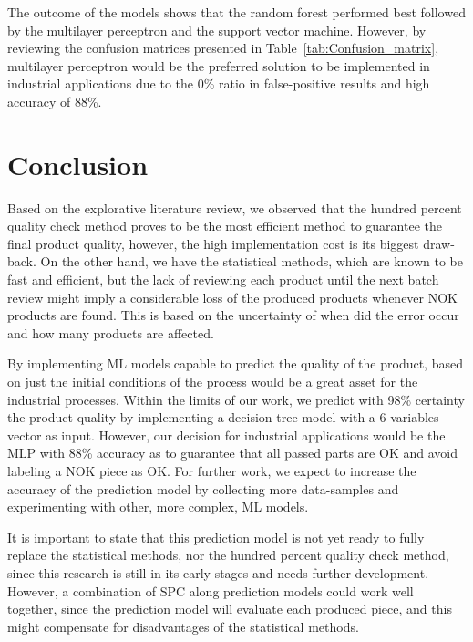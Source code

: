\documentclass[5p,times,procedia]{elsarticle}
\begin{document}
The outcome of the models shows that the random forest performed best followed by the multilayer perceptron and the support vector machine. However, by reviewing the confusion matrices presented in Table~\ref{tab:Confusion_matrix}, multilayer perceptron would be the preferred solution to be implemented in industrial applications due to the 0\% ratio in false-positive results and high accuracy of 88\%.

\section{Conclusion} \label{sec:conclusion}


Based on the explorative literature review, we observed that the hundred percent quality check method proves to be the most efficient method to guarantee the final product quality, however, the high implementation cost is its biggest draw-back. On the other hand, we have the statistical methods, which are known to be fast and efficient, but the lack of reviewing each product until the next batch review might imply a considerable loss of the produced products whenever NOK products are found. This is based on the uncertainty of when did the error occur and how many products are affected.

By implementing ML models capable to predict the quality of the product, based on just the initial conditions of the process would be a great asset for the industrial processes. Within the limits of our work, we predict with 98\% certainty the product quality by implementing a decision tree model with a 6-variables vector as input. 
However, our decision for industrial applications would be the MLP with 88\% accuracy as to guarantee that all passed parts are OK and avoid labeling a NOK piece as OK. For further work, we expect to increase the accuracy of the prediction model by collecting more data-samples and experimenting with other, more complex, ML models.

It is important to state that this prediction model is not yet ready to fully replace the statistical methods, nor the hundred percent quality check method, since this research is still in its early stages and needs further development. However, a combination of SPC along prediction models could work well together, since the prediction model will evaluate each produced piece, and this might compensate for disadvantages of the statistical methods.
\end{document}
